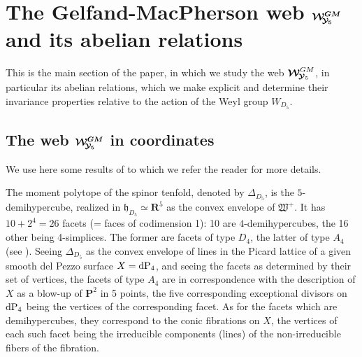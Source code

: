 \documentclass[11pt]{amsart}
\begin{document}
\section{\bf The Gelfand-MacPherson web $\boldsymbol{{\mathcal W}^{GM}_{ \hspace{-0.05cm}{\mathcal Y}_5}}$ and its abelian relations}
\label{S:Intro}
This is the main section of the paper, in which we study the web $\boldsymbol{\mathcal W}^{GM}_{  \hspace{-0.05cm} \boldsymbol{\mathcal Y}_5}$, in particular its abelian relations, which we make explicit and determine their invariance properties relative to the action of the Weyl group $W_{D_5}$. 

\subsection{\bf The web $\boldsymbol{{\mathcal W}^{GM}_{ \hspace{-0.05cm}{\mathcal Y}_5}}$ in coordinates}
\label{SS:WGMS5-in-coordinates}
We use here some results of \cite[\S4.5]{PirioAFST} to which we refer the reader for more details. 


The moment polytope of the spinor tenfold, denoted by $\Delta_{D_5}$, is the $5$-demihypercube, realized in $\mathfrak h_{D_5}\simeq \mathbf R^5$ as the convex envelope of $\mathfrak W^+$. 
It has $10+2^4=26$ facets (= faces of codimension 1): 10 are $4$-demihypercubes, the 16 other being 4-simplices. The former are facets of type $D_4$, the latter of type $A_4$ 
 (see \cite[Fig.\,1]{PirioAFST}).   Seeing $\Delta_{D_5}$ as the convex envelope of lines in the Picard lattice of a given smooth del Pezzo surface $X={\rm dP}_4$, and seeing the facets as determined by their set of vertices, the facets of type $A_4$ are in correspondence with the description 
 of $X$ as a blow-up of $\mathbf P^2$ in 5 points, the five corresponding exceptional divisors on ${\rm dP}_4$ being the vertices of the corresponding facet. As for the facets which are demihypercubes, they correspond to the conic fibrations on $X$, the vertices of each such facet being the irreducible components (lines) of the non-irreducible fibers of the fibration. 
 
\end{document}
